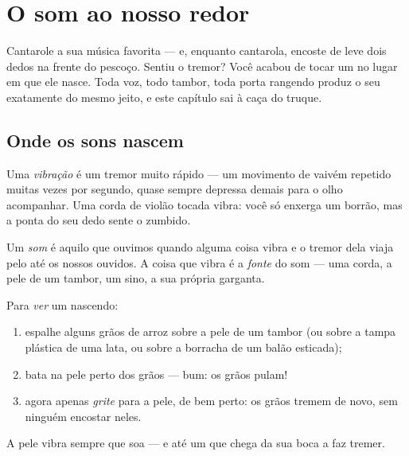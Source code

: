 \chapter{O som ao nosso redor}\label{ch:g3:sound-around-us}

Cantarole a sua música favorita --- e, enquanto cantarola, encoste de
leve dois dedos na frente do pescoço. Sentiu o tremor? Você acabou de
tocar um  no lugar em que ele nasce. Toda voz, todo tambor, toda
porta rangendo produz o seu  exatamente do mesmo jeito, e este
capítulo sai à caça do truque.

\section{Onde os sons nascem}

\begin{definition}[Vibração]\label{def:g3:sound-around-us:vibration}
Uma \emph{vibração} é um tremor muito rápido --- um
movimento de vaivém repetido muitas vezes por segundo, quase sempre
depressa demais para o olho acompanhar. Uma corda de violão tocada
vibra: você só enxerga um borrão, mas a ponta do seu dedo sente o
zumbido.
\end{definition}

\begin{definition}[Som]\label{def:g3:sound-around-us:sound}
Um \emph{som} é aquilo que ouvimos quando alguma coisa
vibra e o tremor dela viaja pelo  até os nossos ouvidos. A coisa
que vibra é a \emph{fonte} do som --- uma corda, a pele de um tambor,
um sino, a sua própria garganta.
\end{definition}

\begin{method}\label{met:g3:sound-around-us:rice}
Para \emph{ver} um  nascendo:
\begin{enumerate}
  \item espalhe alguns grãos de arroz sobre a pele de um tambor (ou
        sobre a tampa plástica de uma lata, ou sobre a borracha de um
        balão esticada);
  \item bata na pele perto dos grãos --- bum: os grãos pulam!
  \item agora apenas \emph{grite} para a pele, de bem perto: os grãos
        tremem de novo, sem ninguém encostar neles.
\end{enumerate}
A pele vibra sempre que soa --- e até um  que chega da sua boca a
faz tremer.
\end{method}

